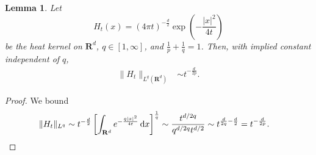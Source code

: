 \documentclass[reqno,11pt]{amsart}
\newcommand{\RR}{\mathbf{R}}
\newcommand*\dif{\mathop{}\!\mathrm{d}}
\newcommand{\dfn}[1]{\emph{#1}\index{#1}}
\newtheorem{lemma}[theorem]{Lemma}
\theoremstyle{definition}
\numberwithin{equation}{section}
\newcommand\todo[1]{\textcolor{red}{TODO: #1}}
\begin{document}
\begin{lemma}
Let
$$H_t(x) = (4\pi t)^{-\frac{d}{2}} \exp\left(-\frac{|x|^2}{4t}\right)$$
be the heat kernel on $\RR^d$, $q \in [1, \infty]$, and $\frac{1}{p} + \frac{1}{q} = 1$.
Then, with implied constant independent of $q$,
\begin{align}
\|H_t\|_{L^q(\RR^d)} &\sim t^{-\frac{d}{2p}}. \label{lq norm of heat kernel}
\end{align}
\end{lemma}
\begin{proof}
We bound
\begin{align*}
\|H_t\|_{L^q} &\sim t^{-\frac{d}{2}} \left[\int_{\RR^d} e^{-\frac{q|x|^2}{4t}} \dif x\right]^{\frac{1}{q}} \sim \frac{t^{d/2q}}{q^{d/2q}t^{d/2}} \sim t^{\frac{d}{2q} - \frac{d}{2}} = t^{-\frac{d}{2p}}. \qedhere
\end{align*}
\end{proof}
\end{document}
